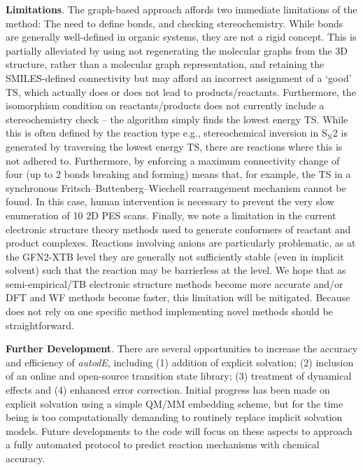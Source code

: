 \documentclass[../../main.tex]{subfiles}
\begin{document}
{\bfseries{Limitations}}. The graph-based approach affords two immediate limitations of the method: The need to define bonds, and checking stereochemistry. While bonds are generally well-defined in organic systems, they are not a rigid concept. This is partially alleviated by using not regenerating the molecular graphs from the 3D structure, rather than a molecular graph representation, and retaining the SMILES-defined connectivity but may afford an incorrect assignment of a ‘good’ TS, which actually does or does not lead to products/reactants. Furthermore, the isomorphism condition on reactants/products does not currently include a stereochemistry check – the algorithm simply finds the lowest energy TS. While this is often defined by the reaction type e.g., stereochemical inversion in S$_\text{N}$2 is generated by traversing the lowest energy TS, there are reactions where this is not adhered to. Furthermore, by enforcing a maximum connectivity change of four (up to 2 bonds breaking and forming) means that, for example, the TS in a synchronous Fritsch–Buttenberg–Wiechell rearrangement mechanism cannot be found. In this case, human intervention is necessary to prevent the very slow enumeration of 10 2D PES scans. Finally, we note a limitation in the current \lmethodx electronic structure theory methods used to generate conformers of reactant and product complexes. Reactions involving anions are particularly problematic, as at the GFN2-XTB level they are generally not sufficiently stable (even in implicit solvent) such that the reaction may be barrierless at the \lmethodx level. We hope that as semi-empirical/TB electronic structure methods become more accurate and/or DFT and WF methods become faster, this limitation will be mitigated. Because \ade does not rely on one specific method implementing novel methods should be straightforward.

{\bfseries{Further Development}}. There are several opportunities to increase the accuracy and efficiency of \emph{autodE}, including (1) addition of explicit solvation; (2) inclusion of an online and open-source transition state library; (3) treatment of dynamical effects and (4) enhanced error correction. Initial progress has been made on explicit solvation using a simple QM/MM embedding scheme, but for the time being is too computationally demanding to routinely replace implicit solvation models. Future developments to the code will focus on these aspects to approach a fully automated protocol to predict reaction mechanisms with chemical accuracy.
\end{document}
